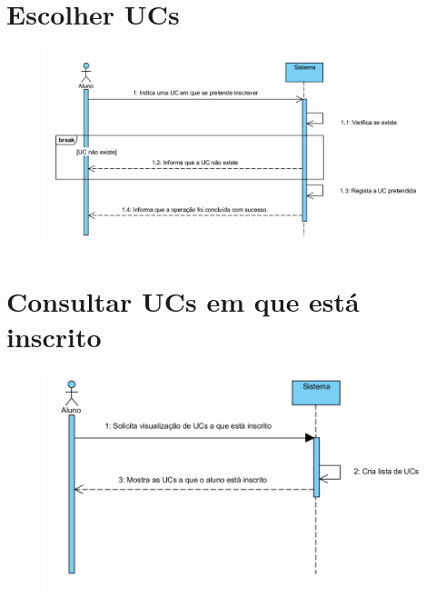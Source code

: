\documentclass[12pt,a4paper]{report}
\begin{document}
\begin{appendices}
\section{Escolher UCs}
\begin{figure}[H]
	\centering 
	\includegraphics[width=\textwidth]{modelacao/use_case_diagram/EscolherUCs.png}  
\end{figure}

\section{Consultar UCs em que está inscrito}
\begin{figure}[H]
	\centering 
	\includegraphics[width=\textwidth]{modelacao/use_case_diagram/ConsultarUCsInscrito.png}  
\end{figure}


\end{appendices}
\end{document}
